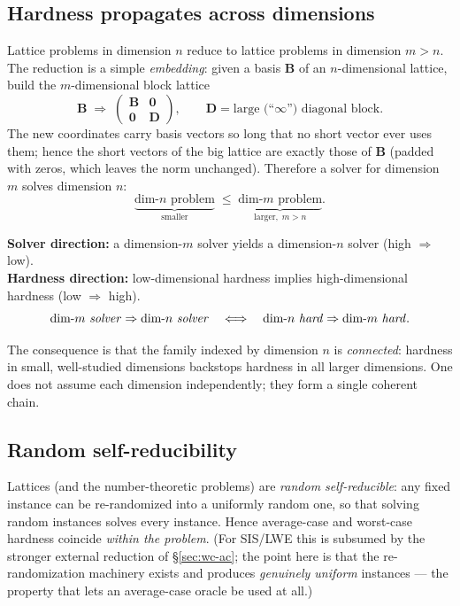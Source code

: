 \documentclass[11pt]{article}
\theoremstyle{definition}
\theoremstyle{plain}
\theoremstyle{remark}
\newcommand{\vB}{\mathbf{B}}
\newcommand{\reduces}{\;\leq\;}
\begin{document}
\subsection{Hardness propagates across dimensions}
\label{sec:dim}

Lattice problems in dimension $n$ reduce to lattice problems in dimension $m>n$. The
reduction is a simple \emph{embedding}: given a basis $\vB$ of an $n$-dimensional lattice,
build the $m$-dimensional block lattice
\[
   \vB \;\Longrightarrow\;
   \begin{pmatrix} \vB & \mathbf 0 \\[2pt] \mathbf 0 & \mathbf D \end{pmatrix},
   \qquad \mathbf D = \text{large (``}\infty\text{'') diagonal block}.
\]
The new coordinates carry basis vectors so long that no short vector ever uses them;
hence the short vectors of the big lattice are exactly those of $\vB$ (padded with zeros,
which leaves the norm unchanged). Therefore a solver for dimension $m$ solves dimension $n$:
\[
   \underbrace{\text{dim-}n\text{ problem}}_{\text{smaller}}
   \reduces
   \underbrace{\text{dim-}m\text{ problem}}_{\text{larger},\; m>n}.
\]

\begin{keybox}
\textbf{Solver direction:} a dimension-$m$ solver yields a dimension-$n$ solver
(high $\Rightarrow$ low).\\
\textbf{Hardness direction:} low-dimensional hardness implies high-dimensional hardness
(low $\Rightarrow$ high).
\[
  \text{dim-}m\ \text{\emph{solver}} \Rightarrow \text{dim-}n\ \text{\emph{solver}}
  \quad\Longleftrightarrow\quad
  \text{dim-}n\ \text{\emph{hard}} \Rightarrow \text{dim-}m\ \text{\emph{hard}}.
\]
\end{keybox}

The consequence is that the family indexed by dimension $n$ is \emph{connected}: hardness
in small, well-studied dimensions backstops hardness in all larger dimensions. One does not
assume each dimension independently; they form a single coherent chain.

\subsection{Random self-reducibility}
\label{sec:rsr}

Lattices (and the number-theoretic problems) are \emph{random self-reducible}: any fixed
instance can be re-randomized into a uniformly random one, so that solving random instances
solves every instance. Hence average-case and worst-case hardness coincide \emph{within the
problem}. (For SIS/LWE this is subsumed by the stronger external reduction of
\S\ref{sec:wc-ac}; the point here is that the re-randomization machinery exists and produces
\emph{genuinely uniform} instances --- the property that lets an average-case oracle be used
at all.)
\end{document}
